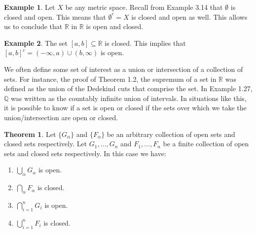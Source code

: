 \documentclass{article}
\newcommand{\R}{\mathbb{R}}
\newcommand{\Q}{\mathbb{Q}}
\theoremstyle{definition}
\newtheorem{theorem}{Theorem}[section]
\newtheorem{example}{Example}[section]
\begin{document}
	\begin{example}
		Let $ X $ be any metric space. Recall from Example 3.14 that $ \emptyset $ is closed and open. This means that $ \emptyset^c=X $ is closed and open as well. This allows us to conclude that $ \R $ in $ \R $ is open and closed.
	\end{example}
	\begin{example}
		The set $ [a,b]\subseteq \R $ is closed. This implies that $ [a,b]^c=(-\infty,a)\cup(b,\infty) $ is open.
	\end{example}
	We often define some set of interest as a union or intersection of a collection of sets. For instance, the proof of Theorem 1.2, the supremum of a set in $ \R $ was defined as the union of the Dedekind cuts that comprise the set. In Example 1.27, $ \Q $ was written as the countably infinite union of intervals. In situations like this, it is possible to know if a set is open or closed if the sets over which we take the union/intersection are open or closed. 
	\begin{theorem}
		Let $ \{G_\alpha\} $ and $ \{F_\alpha\} $ be an arbitrary collection of open sets and closed sets respectively. Let $ G_1,\ldots,G_n $ and $ F_1,\ldots, F_n $ be a finite collection of open sets and closed sets respectively. In this case we have:
		\begin{enumerate}
			\item $ \bigcup_\alpha G_\alpha $ is open.
			\item $ \bigcap_\alpha F_\alpha $ is closed.
			\item $ \bigcap_{i=1}^n G_i$ is open.
			\item $ \bigcup_{i=1}^n F_i$ is closed.
		\end{enumerate}
		
	\end{theorem}
	
\end{document}
